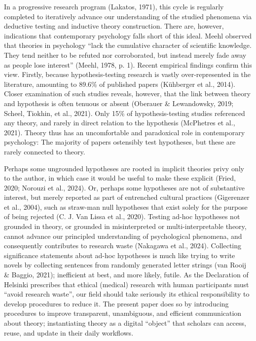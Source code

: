 \documentclass[
  man, noextraspace,floatsintext]{apa7}
\begin{document}
In a progressive research program (Lakatos, 1971),
this cycle is regularly completed to iteratively advance our understanding of the studied phenomena via deductive testing and inductive theory construction.
There are, however, indications that contemporary psychology falls short of this ideal.
Meehl observed that theories in psychology ``lack the cumulative character of scientific knowledge. They tend neither to be refuted nor corroborated, but instead merely fade away as people lose interest'' (Meehl, 1978, p. 1).
Recent empirical findings confirm this view.
Firstly, because hypothesis-testing research is vastly over-represented in the literature, amounting to 89.6\% of published papers (Kühberger et al., 2014).
Closer examination of such studies reveals, however, that the link between theory and hypothesis is often tenuous or absent (Oberauer \& Lewandowsky, 2019; Scheel, Tiokhin, et al., 2021).
Only 15\% of hypothesis-testing studies referenced any theory,
and rarely in direct relation to the hypothesis (McPhetres et al., 2021).
Theory thus has an uncomfortable and paradoxical role in contemporary psychology:
The majority of papers ostensibly test hypotheses,
but these are rarely connected to theory.

Perhaps some ungrounded hypotheses are rooted in implicit theories privy only to the author,
in which case it would be useful to make these explicit (Fried, 2020; Norouzi et al., 2024).
Or, perhaps some hypotheses are not of substantive interest, but merely reported as part of entrenched cultural practices (Gigerenzer et al., 2004),
such as straw-man null hypotheses that exist solely for the purpose of being rejected (C. J. Van Lissa et al., 2020).
\label{waste}{Testing ad-hoc hypotheses not grounded in theory, or grounded in misinterpreted or multi-interpretable theory,
cannot advance our principled understanding of psychological phenomena,
and consequently contributes to research waste (Nakagawa et al., 2024).
\label{norms}{Collecting significance statements about ad-hoc hypotheses is much like trying to write novels by collecting sentences from randomly generated letter strings (van Rooij \& Baggio, 2021); inefficient at best, and more likely, futile.
As the Declaration of Helsinki prescribes that ethical (medical) research with human participants must ``avoid research waste'',
our field should take seriously its ethical responsibility to develop procedures to reduce it.}}
The present paper does so by introducing procedures to improve transparent, unambiguous, and efficient communication about theory;
instantiating theory as a digital ``object'' that scholars can access, reuse, and update in their daily workflows.
\end{document}
